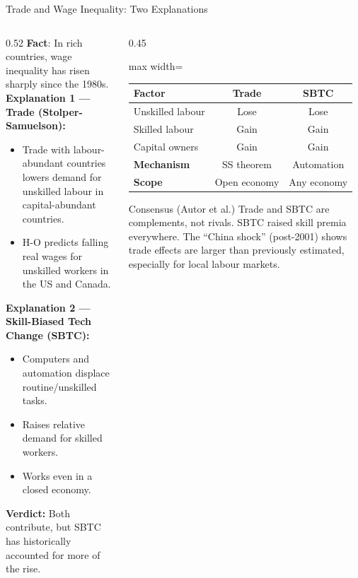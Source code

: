 \documentclass[aspectratio=169]{beamer}
\begin{document}

\begin{frame}[shrink=15]{Trade and Wage Inequality: Two Explanations}
\begin{columns}[T]
\begin{column}{0.52\textwidth}
\textbf{Fact}: In rich countries, wage inequality
has risen sharply since the 1980s.\\[0.3em]
\textbf{Explanation 1 — Trade (Stolper-Samuelson):}
\begin{itemize}\small
  \item Trade with labour-abundant countries
        lowers demand for unskilled labour in
        capital-abundant countries.
  \item H-O predicts falling real wages for
        unskilled workers in the US and Canada.
\end{itemize}
\vspace{0.2em}
\textbf{Explanation 2 — Skill-Biased Tech Change (SBTC):}
\begin{itemize}\small
  \item Computers and automation displace
        routine/unskilled tasks.
  \item Raises relative demand for skilled workers.
  \item Works even in a closed economy.
\end{itemize}
\vspace{0.2em}
\textbf{Verdict:} Both contribute, but SBTC has
historically accounted for more of the rise.
\end{column}
\begin{column}{0.45\textwidth}
\begin{adjustbox}{max width=\columnwidth}
\begin{tabular}{lcc}
\toprule
\textbf{Factor} & \textbf{Trade} & \textbf{SBTC}\\
\midrule
Unskilled labour & Lose & Lose\\
Skilled labour & Gain & Gain\\
Capital owners & Gain & Gain\\
\midrule
\textbf{Mechanism} & SS theorem & Automation\\
\textbf{Scope} & Open economy & Any economy\\
\bottomrule
\end{tabular}
\end{adjustbox}
\vspace{0.4em}
\begin{insight}{Consensus (Autor et al.)}
\small Trade and SBTC are complements, not
rivals. SBTC raised skill premia everywhere.
The ``China shock'' (post-2001) shows trade
effects are larger than previously estimated,
especially for local labour markets.
\end{insight}
\end{column}
\end{columns}
\end{frame}
\end{document}

